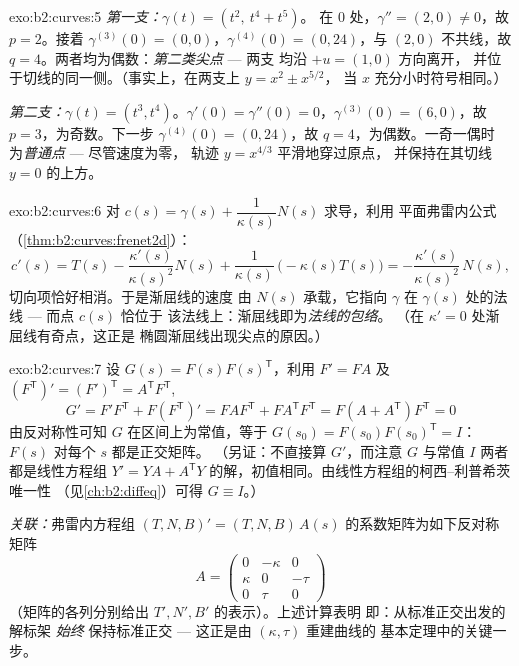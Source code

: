 \begin{solution}{exo:b2:curves:5}
\emph{第一支：}$\gamma(t) = (t^2,\ t^4 + t^5)$。
在 $0$ 处，$\gamma'' = (2, 0) \neq 0$，故 $p = 2$。接着 $\gamma^{(3)}(0)
= (0, 0)$，$\gamma^{(4)}(0) = (0, 24)$，与 $(2,
0)$ 不共线，故 $q = 4$。两者均为偶数：\emph{第二类尖点} --- 两支
均沿 $+u = (1,0)$ 方向离开，
并位于切线的同一侧。（事实上，在两支上 $y = x^2 \pm x^{5/2}$，
当 $x$ 充分小时符号相同。）

\emph{第二支：}$\gamma(t) = (t^3, t^4)$。$\gamma'(0) =
\gamma''(0) = 0$，$\gamma^{(3)}(0) = (6, 0)$，故 $p = 3$，为奇数。下一步
$\gamma^{(4)}(0) = (0, 24)$，故 $q = 4$，为偶数。一奇一偶时
为\emph{普通点} --- 尽管速度为零，
轨迹 $y = x^{4/3}$ 平滑地穿过原点，
并保持在其切线 $y = 0$ 的上方。
\end{solution}

\begin{solution}{exo:b2:curves:6}
对 $c(s) = \gamma(s) + \dfrac{1}{\kappa(s)}N(s)$ 求导，利用
平面弗雷内公式
（\cref{thm:b2:curves:frenet2d}）：
\[
c'(s) = T(s) - \frac{\kappa'(s)}{\kappa(s)^2}N(s)
+ \frac{1}{\kappa(s)}\,\bigl(-\kappa(s)T(s)\bigr)
= -\frac{\kappa'(s)}{\kappa(s)^2}\,N(s) ,
\]
切向项恰好相消。于是渐屈线的速度
由 $N(s)$ 承载，它指向
$\gamma$ 在 $\gamma(s)$ 处的法线 --- 而点 $c(s)$ 恰位于
该法线上：渐屈线即为\emph{法线的包络}。
（在 $\kappa' = 0$ 处渐屈线有奇点，这正是
椭圆渐屈线出现尖点的原因。）
\end{solution}

\begin{solution}{exo:b2:curves:7}
设 $G(s) = F(s)F(s)^{\mathsf T}$，利用 $F' = FA$ 及
$(F^{\mathsf T})' = (F')^{\mathsf T} = A^{\mathsf T}F^{\mathsf T}$,
\[
G' = F'F^{\mathsf T} + F(F^{\mathsf T})'
= FAF^{\mathsf T} + FA^{\mathsf T}F^{\mathsf T}
= F(A + A^{\mathsf T})F^{\mathsf T} = 0
\]
由反对称性可知 $G$ 在区间上为常值，等于
$G(s_0) = F(s_0)F(s_0)^{\mathsf T} = I$：$F(s)$ 对每个 $s$ 都是正交矩阵。
（另证：不直接算 $G'$，而注意 $G$ 与常值 $I$ 两者
都是线性方程组 $Y' = YA +
A^{\mathsf T}Y$ 的解，初值相同。由线性方程组的柯西–利普希茨唯一性
（见\cref{ch:b2:diffeq}）可得 $G
\equiv I$。）

\emph{关联：}弗雷内方程组 $(T, N, B)' = (T, N, B)\,A(s)$
的系数矩阵为如下反对称矩阵
\[
A = \begin{pmatrix} 0 & -\kappa & 0\\ \kappa & 0 & -\tau\\
0 & \tau & 0\end{pmatrix}
\]
（矩阵的各列分别给出 $T', N', B'$ 的表示）。上述计算表明
即：从标准正交出发的解标架 \emph{始终}
保持标准正交 --- 这正是由 $(\kappa, \tau)$ 重建曲线的
基本定理中的关键一步。
\end{solution}

